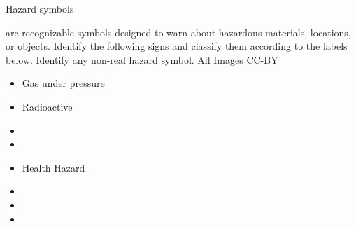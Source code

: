 \documentclass[cover.tex]{subfiles}
\begin{document}
 \begin{refsection}


\begin{bf}Hazard symbols\end{bf} are recognizable symbols designed to warn about hazardous materials, locations, or objects. Identify the following signs and classify them according to the labels below. Identify any non-real hazard symbol. \small{All Images CC-BY}
 \\
\begin{minipage}{.9\textwidth}
 \begin{multicols*}{3}
\begin{itemize}
\item Gas under pressure
\item	Radioactive
\item 
\item	
\item Health Hazard
\item	
\item	
\item 
\end{itemize}
\end{multicols*}

\end{minipage}


\begin{table}[h!]
  \centering
  \begin{tabular}{ cm{5cm}m{5cm}}
    

\end{tabular}
\end{table}
\end{refsection}
\end{document}
